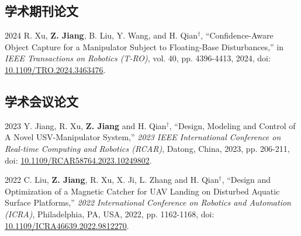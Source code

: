 \documentclass[utf8, 11pt,letterpaper]{report}
\begin{document}
\subsection*{学术期刊论文}
\begin{tablist}
	\item[2024]  \tab{}R. Xu, \textbf{Z. Jiang}, B. Liu, Y. Wang, and H. Qian$^\dagger$, ``Confidence-Aware Object Capture for a Manipulator Subject to Floating-Base Disturbances,'' in \textit{IEEE Transactions on Robotics (T-RO)}, vol. 40, pp. 4396-4413, 2024,  doi: \href{https://doi.org/10.1109/TRO.2024.3463476}{10.1109/TRO.2024.3463476}.
\end{tablist}
	
\subsection*{学术会议论文}
\begin{tablist}
	\item[2023]   \tab{}Y. Jiang, R. Xu, \textbf{Z. Jiang} and H. Qian$^\dagger$, ``Design, Modeling and Control of A Novel USV-Manipulator System,'' \textit{2023 IEEE International Conference on Real-time Computing and Robotics (RCAR)}, Datong, China, 2023, pp. 206-211, doi: \href{https://doi.org/10.1109/RCAR58764.2023.10249802}{ 10.1109/RCAR58764.2023.10249802}.
		
	\item[2022]   \tab{}C. Liu, \textbf{Z. Jiang}, R. Xu, X. Ji, L. Zhang and H. Qian$^\dagger$, ``Design and Optimization of a Magnetic Catcher for UAV Landing on Disturbed Aquatic Surface Platforms,'' \textit{2022 International Conference on Robotics and Automation (ICRA)}, Philadelphia, PA, USA, 2022, pp. 1162-1168, doi: \href{https://doi.org/10.1109/ICRA46639.2022.9812270}{ 10.1109/ICRA46639.2022.9812270}.
\end{tablist}
	
\end{document}
